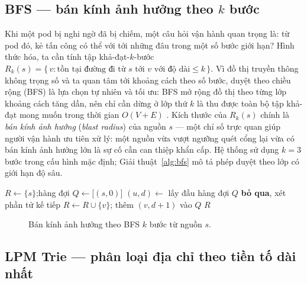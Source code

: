 \subsection{BFS --- bán kính ảnh hưởng theo $k$ bước}

Khi một pod bị nghi ngờ đã bị chiếm, một câu hỏi vận hành quan trọng là: từ pod đó,
kẻ tấn công có thể với tới những đâu trong một số bước giới hạn? Hình thức hóa, ta cần
tính tập khả-đạt-$k$-bước $R_k(s) = \{\, v : \text{tồn tại đường đi từ } s \text{ tới }
v \text{ với độ dài} \le k \,\}$. Vì đồ thị truyền thông không trọng số và ta quan
tâm tới khoảng cách theo số bước, duyệt theo chiều rộng (BFS) là lựa chọn tự nhiên và
tối ưu: BFS mở rộng đồ thị theo từng lớp khoảng cách tăng dần, nên chỉ cần dừng ở lớp
thứ $k$ là thu được toàn bộ tập khả-đạt mong muốn trong thời gian $O(V+E)$
\cite{cormen2009algorithms}. Kích thước của $R_k(s)$ chính là \emph{bán kính ảnh
hưởng} (\textit{blast radius}) của nguồn $s$ --- một chỉ số trực quan giúp người vận
hành ưu tiên xử lý: một nguồn vừa vượt ngưỡng quét cổng lại vừa có bán kính ảnh hưởng
lớn là sự cố cần can thiệp khẩn cấp. Hệ thống sử dụng $k = 3$ bước trong cấu hình mặc
định; Giải thuật~\ref{alg:bfs} mô tả phép duyệt theo lớp có giới hạn độ sâu.

\begin{algorithm}[H]
\caption{BFS giới hạn $k$ bước --- bán kính ảnh hưởng $R_k(s)$}
\label{alg:bfs}
\begin{algorithmic}[1]
\State $R \gets \{s\}$;\quad hàng đợi $Q \gets \big[(s, 0)\big]$
  \State $(u, d) \gets$ lấy đầu hàng đợi $Q$
   \State \textbf{bỏ qua}, xét phần tử kế tiếp \EndIf
      \State $R \gets R \cup \{v\}$;\; thêm $(v, d{+}1)$ vào $Q$
    \EndIf
  \EndFor
\EndWhile
\State \Return $R$
\end{algorithmic}
\end{algorithm}

\begin{figure}[H]
  \centering
  \resizebox{0.72\linewidth}{!}{}
  \caption{Bán kính ảnh hưởng theo BFS $k$ bước từ nguồn $s$.}
  \label{fig:bfs-ex}
\end{figure}

\subsection{LPM Trie --- phân loại địa chỉ theo tiền tố dài nhất}

